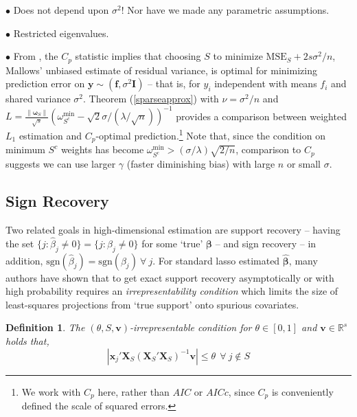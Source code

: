 \documentclass[12pt]{article}
\newtheorem{definition}{\sc Definition}[section]
\newcommand{\bs}[1]{\boldsymbol{#1}}
\newcommand{\mr}[1]{\mathrm{#1}}
\newcommand{\bm}[1]{\mathbf{#1}}
\newcommand{\ds}[1]{\mathds{#1}}
\begin{document}

\noindent $\bullet$   Does not depend upon $\sigma^2$!  Nor have we made any parametric assumptions.

\noindent $\bullet$  Restricted eigenvalues.

\noindent $\bullet$ From \cite{efron_estimation_2004}, the $C_p$ statistic
\citep{mallows_comments_1973} implies that choosing $S$ to minimize
$\mr{MSE}_S + 2s\sigma^2/n$, Mallows' unbiased estimate of residual variance,
is optimal for minimizing prediction error on $\bm{y} \sim
(\bm{f},\sigma^2\bm{I})$ -- that is, for $y_i$ independent with means $f_i$
and shared variance $\sigma^2$. Theorem (\ref{sparseapprox}) with $\nu = \sigma^2/n$ and $L = \frac{\|\bs{\omega}_S\|}{\sqrt{s}}\left(\omega^{\mr{min}}_{S^c}- \sqrt{2}\sigma/(\lambda/\sqrt{n})\right)^{-1}$ provides a comparison between weighted $L_1$ estimation and $C_p$-optimal prediction.\footnote{We work with
$C_p$ here, rather than $AIC$ or $AICc$, since $C_p$ is conveniently defined
the scale of squared errors.} Note that, since the condition on minimum $S^c$ weights has become
$\omega^{\mr{min}}_{S^c} > (\sigma/\lambda)\sqrt{2/n}$, comparison to $C_p$ suggests we can use larger $\gamma$ (faster diminishing bias) with large $n$ or small $\sigma$.

\subsection{Sign Recovery}

Two related goals in high-dimensional estimation are  support recovery -- having the set $\{j: \hat\beta_j \neq 0\} = \{j: \beta_j \neq 0\}$ for some `true' $\bs{\beta}$ -- and  sign recovery -- in addition, $\mr{sgn}(\hat\beta_j) = \mr{sgn}(\beta_j) ~\forall~ j$.  For standard lasso estimated $\bs{\hat\beta}$, many authors have shown \citep[e.g.,][]{buhlmann_statistics_2011,zou_adaptive_2006} that to get exact support recovery asymptotically or with high probability requires an {\it irrepresentability condition} which limits the size of least-squares projections from `true support' onto spurious covariates.  
\begin{definition} 
The $(\theta,S,\bm{v})$-irrepresentable condition for $\theta\in[0,1]$ and $\bm{v}\in \ds{R}^s$ holds that, 
\begin{equation}\label{irrep}
|\bs{x}_j'\bm{X}_S(\bm{X}_S'\bm{X}_S)^{-1}\bm{v}| \leq \theta ~~\forall~j\notin S
\end{equation}
\end{definition}
\end{document}
